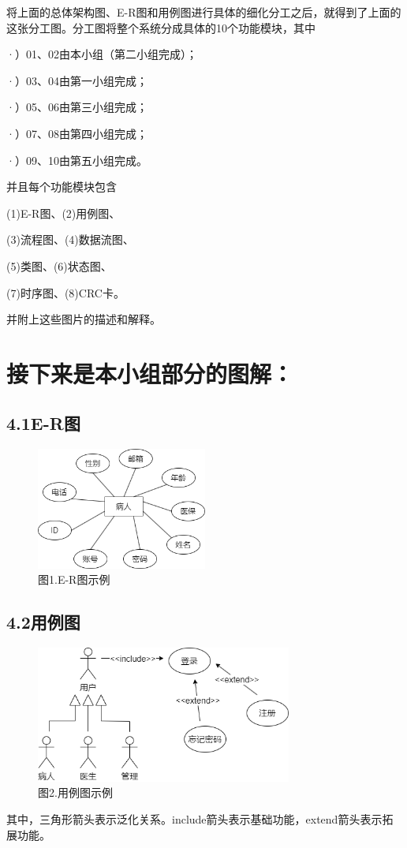 \documentclass[24pt,a4paper]{article}%
\begin{document}
将上面的总体架构图、E-R图和用例图进行具体的细化分工之后，就得到了上面的这张分工图。分工图将整个系统分成具体的10个功能模块，其中\par
·）01、02由本小组（第二小组完成）；\par
·）03、04由第一小组完成；\par
·）05、06由第三小组完成；\par
·）07、08由第四小组完成；\par
·）09、10由第五小组完成。\par
并且每个功能模块包含\par \quad \quad(1)E-R图、(2)用例图、\par \quad \quad(3)流程图、(4)数据流图、\par \quad \quad(5)类图、(6)状态图、\par \quad \quad(7)时序图、(8)CRC卡。\par 并附上这些图片的描述和解释。
\newpage

\section*{\songti 接下来是本小组部分的图解：}
\subsection*{\songti 4.1E-R图}
\begin{figure}[H]
    \centering
    \includegraphics[width=0.5\textwidth]{images/E-R图0.png}
    \caption*{图1.E-R图示例}
\end{figure}
\subsection*{\songti 4.2用例图}
\begin{figure}[H]
    \centering
    \includegraphics[width=0.75\textwidth]{images/用例图.png}
    \caption*{图2.用例图示例}
\end{figure}
其中，三角形箭头表示泛化关系。include箭头表示基础功能，extend箭头表示拓展功能。
\end{document}

